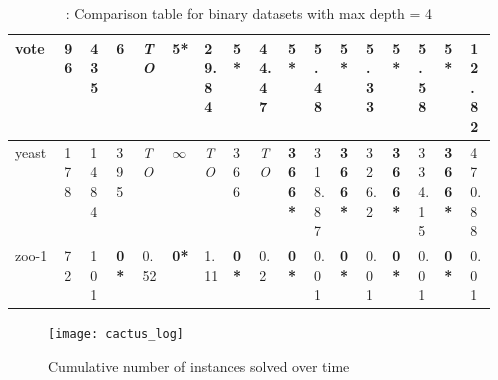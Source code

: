 \begin{table*}
\begin{tabular}{|L{0.08\linewidth}|*{10}{C{0.03\linewidth}|}|*{2}{C{0.03\linewidth}|}|*{2}{C{0.03\linewidth}|}|*{2}{C{0.03\linewidth}|}}
		\hline
		vote	& 96	& 435	& 6	& \emph{TO}	&\bf 5*	& 29.84	&\bf 5*	& 44.47	&\bf 5*	& 5.48	&\bf 5*	& 5.33	&\bf 5*	& 5.58	&\bf 5*	& 12.82     \\
		\hline
		yeast	& 178	& 1484	& 395	& \emph{TO}	& $\infty$	& \emph{TO}	& 366	& \emph{TO}	&\bf 366*	& 318.87	&\bf 366*	& 326.2	&\bf 366*	& 334.15	&\bf 366*	& 470.88        \\
		\hline
		zoo-1	& 72	& 101	&\bf 0*	& 0.52	&\bf 0*	& 1.11	&\bf 0*	& 0.2	&\bf 0*	& 0.01	&\bf 0*	& 0.01	&\bf 0*	& 0.01	&\bf 0*	& 0.01      \\
		\hline
	\end{tabular}
	\caption{: Comparison table for binary datasets with max depth = 4}
	\label{tab:2}
\end{table*}
\begin{figure*}
	\centering
	\texttt{[image: cactus\_log]}
	\caption{Cumulative number of instances solved over time}
	\label{fig:4}
\end{figure*}
